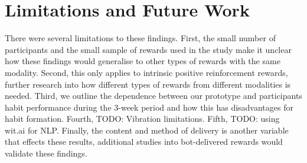 
\newpage

\section{Limitations and Future Work} \label{limitations_and_future_work}
There were several limitations to these findings. First, the small number of participants and the small sample of rewards used in the study make it unclear how these findings would generalise to other types of rewards with the same modality. Second, this only applies to intrinsic positive reinforcement rewards, further research into how different types of rewards from different modalities is needed. Third, we outline the dependence between our prototype and participants habit performance during the 3-week period and how this has disadvantages for habit formation. Fourth, TODO: Vibration limitations. Fifth, TODO: using wit.ai for NLP. Finally, the content and method of delivery is another variable that effects these results, additional studies into bot-delivered rewards would validate these findings.


